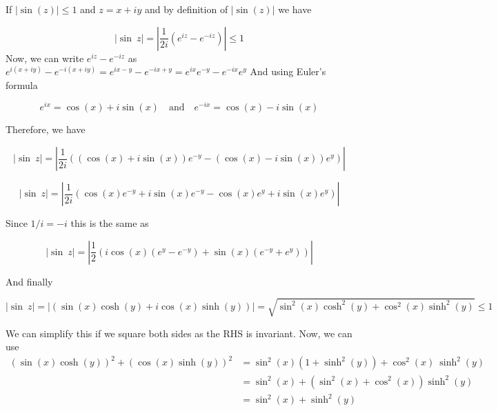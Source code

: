 If $|\sin(z)| \leq 1$ and $z = x + iy$ and by
		            definition of $|\sin(z)|$ we have

		            \begin{equation*}|\sin~z|=\left|\frac{1}{2i}(e^{iz}-e^{-iz})\right| \leq
			            1\end{equation*}
		            Now, we can write $e^{iz} - e^{-iz}$ as
		            $e^{i(x+iy)} -
			            e^{-i(x+iy)} = e^{ix-y} - e^{-ix+y} =
			            e^{ix}e^{-y} - e^{-ix}e^{y}$ And using
		            Euler's
		            formula

		            \begin{equation*}
			            e^{ix} = \cos(x) + i\sin(x) \quad
			            \text{and}
			            \quad
			            e^{-ix} = \cos(x) - i\sin(x)
		            \end{equation*}

		            Therefore, we have

		            \begin{equation*}
			            |\sin~z|=\left|\frac{1}{2i}((\cos(x) +
			            i\sin(x))e^{-y} - (\cos(x) -
			            i\sin(x))e^{y})\right|
		            \end{equation*}

		            \begin{equation*}
			            |\sin~z|=\left|\frac{1}{2i}(\cos(x)e^{-y} +
			            i\sin(x)e^{-y} - \cos(x)e^{y} +
			            i\sin(x)e^{y})\right|
		            \end{equation*}

		            Since $1/i = -i$ this is the same as

		            \begin{equation*}
			            |\sin~z|=\left|\frac{1}{2}(i\cos(x)(e^{y}-e^{-y})
			            + \sin(x)(e^{-y} + e^{y}))\right|
		            \end{equation*}

		            And finally

		            \begin{equation*}
			            |\sin~z|=\left|(\sin(x)\cosh(y) +
			            i\cos(x)\sinh(y))\right| =
			            \sqrt{\sin^2(x)\cosh^2(y) +
				            \cos^2(x)\sinh^2(y)}
			            \leq 1
		            \end{equation*}

		            We can simplify this if we square both sides as the
		            RHS
		            is invariant. Now, we can use
		            \begin{align*}
			            (\sin(x)\cosh(y))^{2}+(\cos(x)\sinh(y))^{2}
			             &
			            =\sin^{2}(x)(1+\sinh^{2}(y))+\cos^{2}(x)~\sinh^{2}(y) \\
			             &
			            =\sin^{2}(x)+(\sin^{2}(x)+\cos^{2}(x))\sinh^{2}(y)    \\
			             & =\sin^{2}(x)+\sinh^{2}(y)
			            \\
		            \end{align*}

